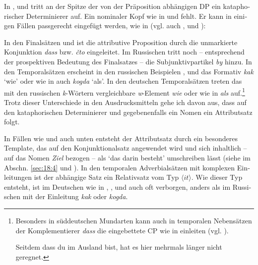 \documentclass[output=paper, colorlinks, citecolor=brown, booklanguage=german]{langscibook}
\begin{document}
\begin{otherlanguage}{german}
\noindent In ,  und  tritt an der Spitze der von der Präposition abhängigen DP ein kataphorischer Determinierer auf. Ein nominaler Kopf wie in  und  fehlt. Er kann in einigen Fällen passgerecht eingefügt werden, wie in  (vgl. auch ,  und ):

\ea \label{ex:18:14}
	\z
\z

\noindent In den Finalsätzen  und  ist die attributive Proposition durch die unmarkierte Konjunktion \textit{dass} bzw. \textit{čto} eingeleitet. Im Russischen tritt noch -- ent\-spre\-chend der prospektiven Bedeutung des Finalsatzes -- die Subjunktivpartikel \textit{by} hinzu. In den Temporalsätzen erscheint in den russischen Beispielen ,  und  das Formativ \textit{kak} ‘wie' oder wie in  auch \textit{kogda} ‘als'. In den deutschen Temporalsätzen treten das mit den russischen \textit{k}-Wörtern vergleichbare \textit{w}-Element \textit{wie} oder wie in  \textit{als} auf.\footnote{\label{fn:18:2}Besonders in süddeutschen Mundarten kann auch in temporalen Nebensätzen der Komplementierer \textit{dass} die eingebettete CP wie in  einleiten (vgl. ).

\ea \label{ex:18:1fn2} Seitdem dass du im Ausland bist, hat es hier mehrmals länger nicht geregnet.
\z

} Trotz dieser Unterschiede in den Ausdrucksmitteln gehe ich davon aus, dass auf den kataphorischen De\-ter\-mi\-nie\-rer und gegebenenfalls ein Nomen ein Attributsatz folgt.

In Fällen wie  und auch  unten entsteht der Attributsatz durch ein besonderes Template, das auf den Konjunktionalsatz angewendet wird und sich inhaltlich -- auf das Nomen \textit{Ziel} bezogen -- als `das darin besteht' umschreiben lässt (siehe  im Abschn. \ref{sec:18:4} und \citealt{Zimmermann2015}). In den temporalen Adverbialsätzen mit komplexen Einleitungen ist der abhängige Satz ein Relativsatz vom Typ $\langle it \rangle$. Wie dieser Typ entsteht, ist im Deutschen wie in , ,  und auch  oft verborgen, anders als im Russischen mit der Einleitung \textit{kak} oder \textit{kogda}.


\end{otherlanguage}
\end{document}

